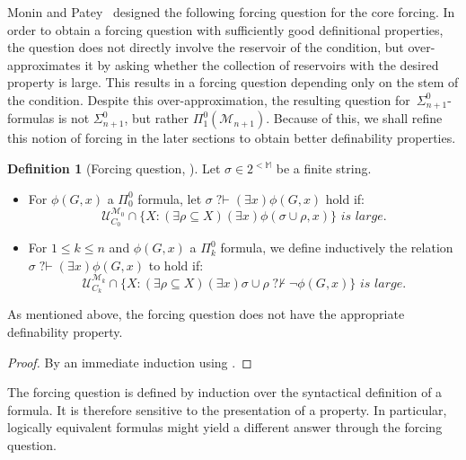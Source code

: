 \documentclass{article}
\def\MM{\mathbb{M}}
\def\U{\mathcal{U}}
\def\M{\mathcal{M}}
\newcommand{\qvdash}{\operatorname{{?}{\vdash}}}
\newcommand{\nqvdash}{\operatorname{{?}{\nvdash}}}
\numberwithin{theorem}{section}
\newtheorem{lemma}[theorem]{Lemma}
\theoremstyle{definition}
\newtheorem{definition}[theorem]{Definition}
\begin{document}
Monin and Patey~\cite{monin2021weakness} designed the following forcing question for the core forcing. In order to obtain a forcing question with sufficiently good definitional properties, the question does not directly involve the reservoir of the condition, but over-approximates it by asking whether the collection of reservoirs with the desired property is large. This results in a forcing question depending only on the stem of the condition. Despite this over-approximation, the resulting question for~$\Sigma^0_{n+1}$-formulas is not $\Sigma^0_{n+1}$, but rather $\Pi^0_1(\M_{n+1})$. Because of this, we shall refine this notion of forcing in the later sections to obtain better definability properties.

\begin{definition}[{Forcing question, \cite[Definition 3.3]{monin2021weakness}}]
    Let $\sigma \in 2^{<\MM}$ be a finite string.

    \begin{itemize}
        \item For $\phi(G,x)$ a $\Pi_0^0$ formula, let $\sigma \qvdash (\exists x)\phi(G,x)$ hold if: 
        $$\U_{C_0}^{\M_0} \cap \{X : (\exists \rho \subseteq X)(\exists x)\phi(\sigma \cup \rho, x) \} \textit{ is large}.$$
        \item 
    For $1 \leq k \leq n$ and $\phi(G,x)$ a $\Pi_k^0$ formula, we define inductively the relation $\sigma \qvdash (\exists x)\phi(G,x)$ to hold if: $$\U_{C_{k}}^{\M_{k}} \cap \{X : (\exists \rho \subseteq X)(\exists x) \sigma \cup \rho \nqvdash \neg \phi(G,x) \} \textit{ is large}.$$
    \end{itemize}
\end{definition}


As mentioned above, the forcing question does not have the appropriate definability property.

\begin{proof}
By an immediate induction using .
\end{proof}

The forcing question is defined by induction over the syntactical definition of a formula. It is therefore sensitive to the presentation of a property. In particular, logically equivalent formulas might yield a different answer through the forcing question. 
\end{document}
